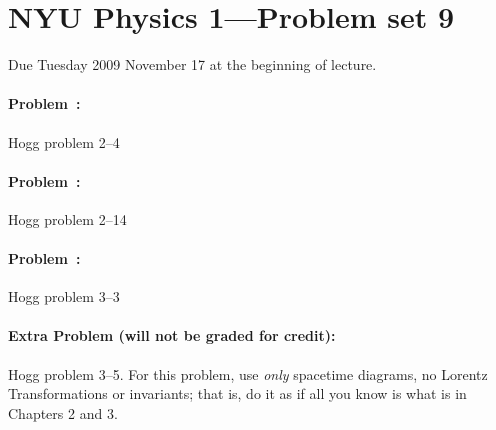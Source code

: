 \documentclass[12pt]{article}
\newcounter{problem}
\begin{document}
\thispagestyle{empty}

\section*{NYU Physics 1---Problem set 9}

Due Tuesday 2009 November 17 at the beginning of lecture.

\paragraph{Problem~\theproblem:}%
Hogg problem 2--4

\paragraph{Problem~\theproblem:}%
Hogg problem 2--14

\paragraph{Problem~\theproblem:}%
Hogg problem 3--3

\paragraph{Extra Problem (will not be graded for credit):}%
Hogg problem 3--5.  For this problem, use \emph{only} spacetime
diagrams, no Lorentz Transformations or invariants; that is, do it as
if all you know is what is in Chapters 2 and 3.
\end{document}
